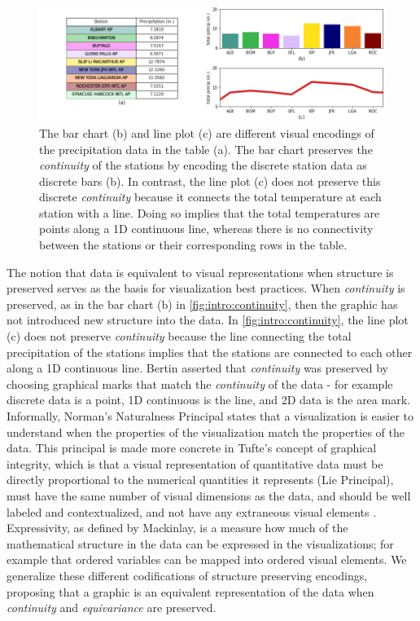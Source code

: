 \documentclass[../main.tex]{subfiles}
\begin{document}
\begin{figure}[H]
    \includegraphics[width=1\textwidth]{figures/intro/continuity.png}
    \caption{The bar chart (b) and line plot (c) are different visual encodings of the precipitation data in the table (a). The bar chart preserves the \textit{continuity} of the stations by encoding the discrete station data as discrete bars (b). In contrast, the line plot (c) does not preserve this discrete \textit{continuity} because it connects the total temperature at each station with a line. Doing so implies that the total temperatures are points along a 1D continuous line, whereas there is no connectivity between the stations or their corresponding rows in the table.}
    \label{fig:intro:continuity}
\end{figure}
The notion that data is equivalent to visual representations when structure is preserved serves as the basis for visualization best practices. When \textit{continuity} is preserved, as in the bar chart (b) in \autoref{fig:intro:continuity}, then the graphic has not introduced new structure into the data.  In \autoref{fig:intro:continuity}, the line plot (c) does not preserve \textit{continuity} because the line connecting the total precipitation of the stations implies that the stations are connected to each other along a 1D continuous line. Bertin asserted that \textit{continuity} was preserved by choosing graphical marks that match the \textit{continuity} of the data - for example discrete data is a point, 1D continuous is the line, and 2D data is the area mark. Informally, Norman's Naturalness Principal  \cite{NaturalnessPrincipleInfoVis,norman_things_smart} states that a visualization is easier to understand when the properties of the visualization match the properties of the data. This principal is made more concrete in Tufte's concept of graphical integrity, which is that a visual representation of quantitative data must be directly proportional to the numerical quantities it represents (Lie Principal), must have the same number of visual dimensions as the data, and should be well labeled and contextualized, and not have any extraneous visual elements  \cite{tufteVisualDisplayQuantitative2001}. Expressivity, as defined by Mackinlay, is a measure how much of the mathematical structure in the data can be expressed in the visualizations; for example that ordered variables can be mapped into ordered visual elements. We generalize these different codifications of structure preserving encodings, proposing that a graphic is an equivalent representation of the data when \textit{continuity} and \textit{equivariance} are preserved.
\end{document}
